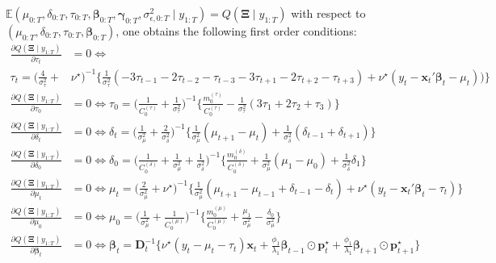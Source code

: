 \documentclass[
  12pt,
]{book}
\theoremstyle{break}
\theoremstyle{nonumberplain}
\begin{document}
\(\mathbb E(\mu_{0:T},\delta_{0:T},\tau_{0:T},\boldsymbol{\beta}_{0:T},\boldsymbol{\gamma}_{0:T},\sigma^{2}_{\epsilon,0:T}\mid y_{1:T})=Q(\boldsymbol{\Xi}\mid y_{1:T})\)
with respect to
\((\mu_{0:T},\delta_{0:T},\tau_{0:T},\boldsymbol{\beta}_{0:T})\), one
obtains the following first order conditions: \begin{align*}
\frac{\partial Q(\boldsymbol{\Xi}\mid y_{1:T})}{\partial \tau_{t}}  & = 0 \iff \\
\tau_{t} =\bigg(\frac{4}{\sigma^{2}_{\tau}}+ & \nu^{\star}\bigg)^{-1}\bigg\{\frac{1}{\sigma^{2}_{\tau}}(-3\tau_{t-1}-2\tau_{t-2}-\tau_{t-3}-3\tau_{t+1}-2\tau_{t+2}-\tau_{t+3})+\nu^{\star}(y_{t}-\boldsymbol{x}_{t}'\boldsymbol{\beta}_{t}-\mu_{t}))\bigg\} \\
 \frac{\partial Q(\boldsymbol{\Xi}\mid y_{1:T})}{\partial \tau_{0}} & = 0 \iff
 \tau_{0} = \bigg(\frac{1}{C_{0}^{(\tau)}}+\frac{1}{\sigma^{2}_{\tau}}\bigg)^{-1}\bigg\{\frac{m_{0}^{(\tau)}}{C_{0}^{(\tau)}}-\frac{1}{\sigma^{2}_{\tau}}(3\tau_{1}+2\tau_{2}+\tau_{3})\bigg\} \\
 \frac{\partial Q(\boldsymbol{\Xi}\mid y_{1:T})}{\partial \delta_{t}} & = 0 \iff  \delta_{t} =\bigg(\frac{1}{\sigma^{2}_{\mu}}+\frac{2}{\sigma^{2}_{\delta}}\bigg)^{-1}\bigg\{\frac{1}{\sigma^{2}_{\mu}}(\mu_{t+1}-\mu_{t})+\frac{1}{\sigma^{2}_{\delta}}(\delta_{t-1}+\delta_{t+1})\bigg\} \\
\frac{\partial Q(\boldsymbol{\Xi}\mid y_{1:T})}{\partial \delta_{0}} & = 0 \iff  \delta_{0}=\bigg(\frac{1}{C_{0}^{(\delta)}}+\frac{1}{\sigma^{2}_{\mu}}+\frac{1}{\sigma^{2}_{\delta}}\bigg)^{-1}\bigg\{\frac{m_{0}^{(\delta)}}{C_{0}^{(\delta)}}+\frac{1}{\sigma^{2}_{\mu}}(\mu_{1}-\mu_{0})+\frac{1}{\sigma^{2}_{\delta}}\delta_{1}\bigg\} \\
\frac{\partial Q(\boldsymbol{\Xi}\mid y_{1:T})}{\partial \mu_{t}} & = 0 \iff
\mu_{t} = \bigg(\frac{2}{\sigma^{2}_{\mu}}+\nu^{\star}\bigg)^{-1}\bigg\{\frac{1}{\sigma^{2}_{\mu}}(\mu_{t+1}-\mu_{t-1}+\delta_{t-1}-\delta_{t})+\nu^{\star}(y_{t}-\boldsymbol{x}_{t}'\boldsymbol{\beta}_{t}-\tau_{t})\bigg\} \\
\frac{\partial Q(\boldsymbol{\Xi}\mid y_{1:T})}{\partial \mu_{0}} & = 0 \iff 
\mu_{0} = \bigg(\frac{1}{\sigma^{2}_{\mu}}+\frac{1}{C_{0}^{(\mu)}}\bigg)^{-1}\bigg\{\frac{m_{0}^{(\mu)}}{C_{0}^{(\mu)}}+\frac{\mu_{1}}{\sigma^{2}_{\mu}}-\frac{\delta_{0}}{\sigma^{2}_{\mu}}\bigg\} \\
\frac{\partial Q(\boldsymbol{\Xi}\mid y_{1:T})}{\partial \boldsymbol{\beta}_{t}} & = 0 \iff \boldsymbol{\beta}_{t} = \boldsymbol{D}_{t}^{-1}\bigg\{\nu^{\star}(y_{t}-\mu_{t}-\tau_{t})\boldsymbol{x}_{t}+\frac{\phi_1}{\lambda_1}\boldsymbol{\beta}_{t-1}\odot\boldsymbol{p}^{\star}_{t}+\frac{\phi_1}{\lambda_{1}}\boldsymbol{\beta}_{t+1}\odot\boldsymbol{p}^{\star}_{t+1}\bigg\} \\

\end{align*}
\end{document}
